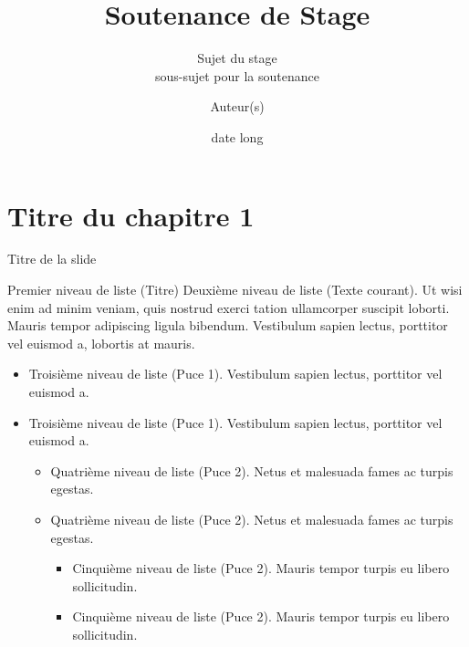 \documentclass[A4,svgnames,9pt,aspectratio=169]{beamer}
\title[titrecourt]{Soutenance de Stage}
\subtitle{Sujet du stage\\ sous-sujet pour la soutenance}
\date[00/00/202X]{date long}
\author[A. et al.]{Auteur(s)}
\begin{document}

\frame{\titlepage}


\renewcommand{\contentsname}{Sommaire}



\frame{\tocpage}

 
\section{Titre du chapitre 1}
\frame{\sectionpage}


\begin{frame}{Titre de la slide}
    \begin{block}{Premier niveau de liste (Titre)}
       Deuxième niveau de liste (Texte courant). Ut wisi enim ad minim veniam, quis nostrud exerci tation
       ullamcorper suscipit loborti. Mauris tempor adipiscing ligula bibendum. Vestibulum sapien lectus,
       porttitor vel euismod a, lobortis at mauris.
      \begin{itemize}
         \item Troisième niveau de liste (Puce 1). Vestibulum sapien lectus, porttitor vel euismod a.
         \item Troisième niveau de liste (Puce 1). Vestibulum sapien lectus, porttitor vel euismod a.
         \begin{itemize}
            \item Quatrième niveau de liste (Puce 2). Netus et malesuada fames ac turpis egestas.
            \item Quatrième niveau de liste (Puce 2). Netus et malesuada fames ac turpis egestas.
            \begin{itemize}
               \item Cinquième niveau de liste (Puce 2). Mauris tempor turpis eu libero sollicitudin.
               \item Cinquième niveau de liste (Puce 2). Mauris tempor turpis eu libero sollicitudin.
            \end{itemize}
          \end{itemize}
        \end{itemize}
   \end{block}
\end{frame}
\end{document}
